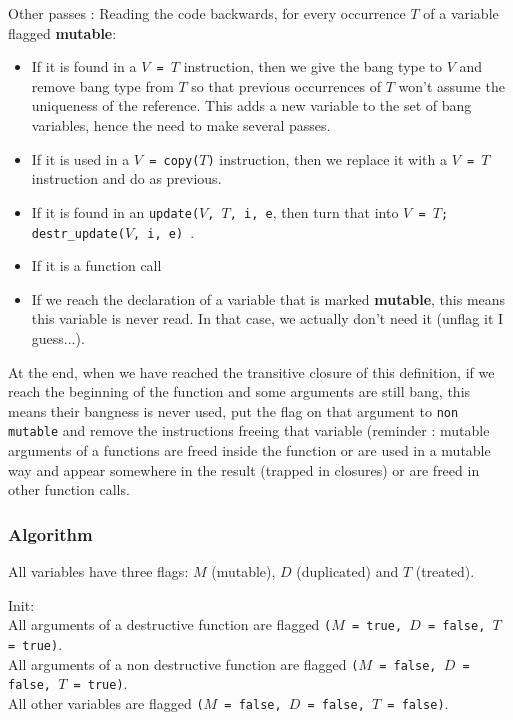 \documentclass[12pt,a4paper]{article}
\newcommand{\cl}[1]{\texttt{#1}}
\begin{document}
Other passes :
Reading the code backwards, for every occurrence $T$ of a variable flagged \textbf{mutable}:
\begin{itemize}
\item If it is found in a \cl{$V$ = $T$} instruction, then we give the bang type to $V$ and remove bang type from $T$ so that previous occurrences of $T$ won't assume the uniqueness of the reference. This adds a new variable to the set of bang variables, hence the need to make several passes.
\item If it is used in a \cl{$V$ = copy($T$)} instruction, then we replace it with a \cl{$V$ = $T$} instruction and do as previous.
\item If it is found in an \cl{update($V$, $T$, i, e}, then turn that into \cl{$V$ = $T$; destr\_update($V$, i, e) }.
\item If it is a function call 
\item If we reach the declaration of a variable that is marked \textbf{mutable}, this means this variable is never read. In that case, we actually don't need it (unflag it I guess...).
\end{itemize}

At the end, when we have reached the transitive closure of this definition, if we reach the beginning of the function and some arguments are still bang, this means their bangness is never used, put the flag on that argument to \cl{non mutable} and remove the instructions freeing that variable (reminder : mutable arguments of a functions are freed inside the function or are used in a mutable way and appear somewhere in the result (trapped in closures) or are freed in other function calls.



\subsubsection{Algorithm}




All variables have three flags: $M$ (mutable), $D$ (duplicated) and $T$ (treated).

Init:\\
All arguments of a destructive function are flagged \cl{($M$ = true, $D$ = false, $T$ = true)}.\\
All arguments of a non destructive function are flagged \cl{($M$ = false, $D$ = false, $T$ = true)}.\\
All other variables are flagged \cl{($M$ = false, $D$ = false, $T$ = false)}.\\
\end{document}

